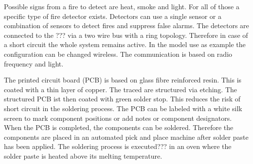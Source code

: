Possible signs from a fire to detect are heat, smoke and light. For all of 
those a specific type of fire detector exists. Detectors can use a single 
sensor or a combination of sensors to detect fires and suppress false alarms. 
The detectors are connected to the ??? via a two wire bus with a ring 
topology. Therefore in case of a short circuit the whole system remains 
active. In the model use as example the configuration can be changed wireless. 
The communication is based on radio frequency and light. 

The printed circuit board (PCB) is based on glass fibre reinforced resin. This 
is coated with a thin layer of copper. The traced are structured via etching. 
The structured PCB ist then coated with green solder stop. This reduces the 
risk of short circuit in the soldering process. The PCB can be labeled with a 
white silk screen to mark component positions or add notes or component 
designators. When the PCB is completed, the components can be soldered. 
Therefore the components are placed in an automated pick and place machine 
after solder paste has been applied. The soldering process is executed??? in 
an oven where the solder paste is heated above its melting temperature. 
